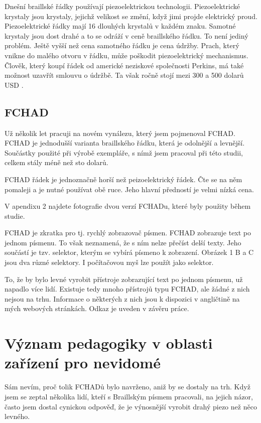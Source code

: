 Dnešní braillské řádky používají piezoelektrickou technologii.  Piezoelektrické krystaly jsou krystaly, jejichž velikost se změní, když jimi projde elektrický proud. Piezoelektrické řádky mají 16 dlouhých krystalů v každém znaku.  Samotné krystaly jsou dost drahé a to se odráží v ceně braillského řádku. To není jediný problém.  Ještě vyšší než cena samotného řádku je cena údržby.  Prach, který vnikne do malého otvoru v řádku, může poškodit piezoelektrický mechanismus.  Člověk, který koupí řádek od americké neziskové společnosti Perkins, má také možnost uzavřít smlouvu o údržbě. Ta však ročně stojí mezi 300 a 500 dolarů USD \citep{perkinsdisplays}.

\subsection{FCHAD}

Už několik let pracuji na novém vynálezu, který jsem pojmenoval FCHAD. FCHAD je jednodušší varianta braillského řádku, která je odolnější a levnější.  Součástky použité při výrobě exempláře, s nímž jsem pracoval při této studii, celkem stály méně než sto dolarů.

FCHAD řádek je jednoznačně horší než peizoelektrický řádek.  Čte se na něm pomaleji a je nutné používat obě ruce.  Jeho hlavní předností je velmi nízká cena.

V apendixu 2 najdete fotografie dvou verzí FCHADu, které byly použity během studie.

FCHAD je zkratka pro  tj. rychlý zobrazovač písmen.  FCHAD zobrazuje text po jednom písmenu. To však neznamená, že s ním nelze přečíst delší texty.  Jeho součástí je tzv. selektor, kterým se vybírá písmeno k zobrazení. Obrázek 1 B a C jsou dva různé selektory.  I počítačovou myš lze použít jako selektor.

To, že by bylo levné vyrobit přístroje zobrazující text po jednom písmenu, už napadlo více lidí. Existuje tedy mnoho přístrojů typu FCHAD, ale žádné z nich nejsou na trhu.  Informace o některých z nich jsou k dispozici v angličtině na mých webových stránkách. Odkaz je uveden v závěru práce.

\section{Význam pedagogiky v oblasti zařízení pro nevidomé}

Sám nevím, proč tolik FCHADů bylo navrženo, aniž by se dostaly na trh.  Když jsem se zeptal několika lidí, kteří s Braillským písmem pracovali, na jejich názor, často jsem dostal cynickou odpověď, že je výnosnější vyrobit drahý piezo než něco levného.

